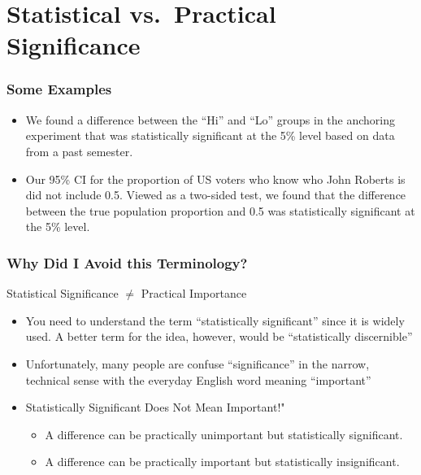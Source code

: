 \section{Statistical vs.\ Practical Significance}
\begin{frame}
\frametitle{Some Examples}

	\begin{itemize}
		\item We found a difference between the ``Hi'' and ``Lo'' groups in the anchoring experiment that was statistically significant at the 5\% level based on data from a past semester.
		\item Our 95\% CI for the proportion of US voters who know who John Roberts is did not include 0.5. Viewed as a two-sided test, we found that the difference between the true population proportion and 0.5 was statistically significant at the 5\% level.
	\end{itemize}

\end{frame}
\begin{frame}
\frametitle{Why Did I Avoid this Terminology?}
\small
\begin{block}{Statistical Significance $\neq$ Practical Importance}
	\begin{itemize}
		\item You need to understand the term ``statistically significant'' since it is widely used. A better term for the idea, however, would be ``statistically discernible''
		\item Unfortunately, many people are confuse ``significance'' in the narrow, technical sense with the everyday English word meaning ``important'' 
		\item \alert{Statistically Significant Does Not Mean Important!"}
			\begin{itemize}
				\item A difference can be practically unimportant but statistically significant.
				\item A difference can be practically important but statistically insignificant.
			\end{itemize}
	\end{itemize}
\end{block}


\end{frame}


